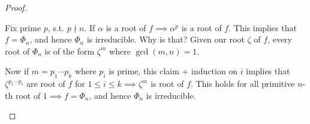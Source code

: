\begin{proposition}
\begin{enumerate}
\begin{proof}
			      \begin{claim}
				      Fix prime \( p \), s.t. \( p\nmid n \). If \( \alpha \) is a root of \( f \implies
				      \alpha^p \) is a root of \( f \). This implies that \( f = \Phi_n \), and hence \( \Phi_n \) is
				      irreducible. Why is that? Given our root \( \zeta \) of \( f \), every root of \( \Phi_n \) is
				      of the form \( \zeta^m \) where \( \gcd(m,n) = 1 \).

				      Now if \( m = p_1\cdots p_k \) where \( p_i \) is prime, this claim + induction on \( i \) implies that
				      \( \zeta^{p_1\cdots p_i} \) are root of \( f \) for \( 1\leq i \leq k \implies \zeta^m \) is root
				      of \( f \). This holds for all primitive \( n \)-th root of \( 1 \implies f = \Phi_n \), and hence
				      \( \Phi_n \) is irreducible.
			      \end{claim}


\end{proof}
\end{enumerate}
\end{proposition}
